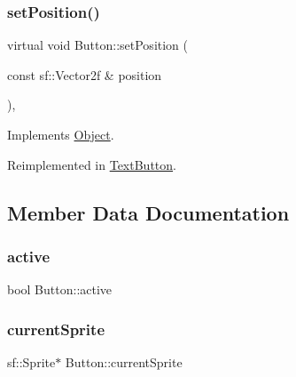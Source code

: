 \mbox{\label{class_button_a95a9aafc24ed5d95d3557f7155832433}} 
\subsubsection{\texorpdfstring{setPosition()}{setPosition()}}
{\footnotesize\ttfamily virtual void Button\+::set\+Position (\begin{DoxyParamCaption}\item[{const sf\+::\+Vector2f \&}]{position }\end{DoxyParamCaption})\hspace{0.3cm}{\ttfamily [inline]}, {\ttfamily [virtual]}}



Implements \mbox{\hyperlink{class_object_ac5c796bfa75dedf6d3bfc74685b2b77d}{Object}}.



Reimplemented in \mbox{\hyperlink{class_text_button_a4550c33ce65f77b9e9e119526bfcc357}{Text\+Button}}.



\subsection{Member Data Documentation}
\mbox{\label{class_button_a03070c78335786c482088bf00c894325}} 
\subsubsection{\texorpdfstring{active}{active}}
{\footnotesize\ttfamily bool Button\+::active\hspace{0.3cm}{\ttfamily [protected]}}

\mbox{\label{class_button_ae43bb88d6b390a0ab6607278102952c4}} 
\subsubsection{\texorpdfstring{currentSprite}{currentSprite}}
{\footnotesize\ttfamily sf\+::\+Sprite$\ast$ Button\+::current\+Sprite\hspace{0.3cm}{\ttfamily [protected]}}

